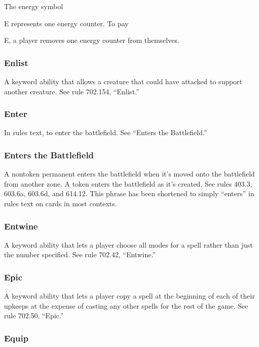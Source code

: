 {{{{{{{The energy symbol {E represents one energy counter. To pay {E, a player removes one energy counter from themselves.

\subsubsection*{Enlist}

A keyword ability that allows a creature that could have attacked to support another creature. See rule 702.154, “Enlist.”

\subsubsection*{Enter}

In rules text, to enter the battlefield. See “Enters the Battlefield.”

\subsubsection*{Enters the Battlefield}

A nontoken permanent enters the battlefield when it’s moved onto the battlefield from another zone. A token enters the battlefield as it’s created. See rules 403.3, 603.6a, 603.6d, and 614.12. This phrase has been shortened to simply “enters” in rules text on cards in most contexts.

\subsubsection*{Entwine}

A keyword ability that lets a player choose all modes for a spell rather than just the number specified. See rule 702.42, “Entwine.”

\subsubsection*{Epic}

A keyword ability that lets a player copy a spell at the beginning of each of their upkeeps at the expense of casting any other spells for the rest of the game. See rule 702.50, “Epic.”

\subsubsection*{Equip}

}}}}}}}}}
